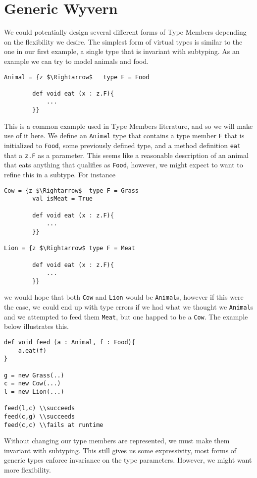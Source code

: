 \documentclass[11pt
              , a4paper
              , twoside
              , openright
              ]{report}
\numberwithin{case}{theorem}
\numberwithin{subcase}{case}
\begin{document}
\chapter{Generic Wyvern}\label{ch:wyvern}
We could potentially design several different forms of Type Members depending on the flexibility we desire. The simplest form of virtual types is similar to the one in our first example, a single type that is invariant with subtyping. As an example we can try to model animals and food. 
\begin{lstlisting}[mathescape, style=custom_lang]
Animal = {z $\Rightarrow$	type F = Food
		
		def void eat (x : z.F){
			...
		}}
\end{lstlisting}
This is a common example used in Type Members literature, and so we will make use of it here. We define an \verb|Animal| type that contains a type member \verb|F| that is initialized to \verb|Food|, some previously defined type, and a method definition \verb|eat| that a \verb|z.F| as a parameter. This seems like a reasonable description of an animal that eats anything that qualifies as \verb|Food|, however, we might expect to want to refine this in a subtype. For instance
\begin{lstlisting}[mathescape, style=custom_lang]
Cow = {z $\Rightarrow$	type F = Grass
		val isMeat = True
		
		def void eat (x : z.F){
			...
		}}

Lion = {z $\Rightarrow$	type F = Meat
		
		def void eat (x : z.F){
			...
		}}
\end{lstlisting}
we would hope that both \verb|Cow| and \verb|Lion| would be \verb|Animal|s, however if this were the case, we could end up with type errors if we had what we thought we \verb|Animal|s and we attempted to feed them \verb|Meat|, but one happed to be a \verb|Cow|. The example below illustrates this.
\begin{lstlisting}[mathescape, style=custom_lang]
def void feed (a : Animal, f : Food){
	a.eat(f)
}

g = new Grass(..)
c = new Cow(...)
l = new Lion(...)

feed(l,c) \\succeeds
feed(c,g) \\succeeds
feed(c,c) \\fails at runtime
\end{lstlisting}
Without changing our type members are represented, we must make them invariant with subtyping. This still gives us some expressivity, most forms of generic types enforce invariance on the type parameters. However, we might want more flexibility.
\end{document}
